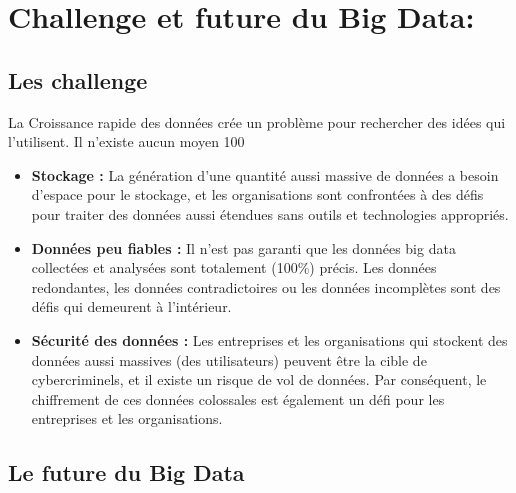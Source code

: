 \section{Challenge et future du Big Data:}

\subsection{Les challenge}
La Croissance rapide des données crée un problème pour rechercher des idées qui l’utilisent. Il n’existe aucun moyen 100%

\begin{itemize}\renewcommand{\labelitemi}{$\bullet$}
\item \textbf{Stockage :} La génération d’une quantité aussi massive de données a besoin d’espace pour le stockage, et les organisations sont confrontées à des défis pour traiter des données aussi étendues sans outils et technologies appropriés.
\item \textbf{Données peu fiables :} Il n’est pas garanti que les données big data collectées et analysées sont totalement (100\%) précis. Les données redondantes, les données contradictoires ou les données incomplètes sont des défis qui demeurent à l’intérieur.
\item \textbf{Sécurité des données :} Les entreprises et les organisations qui stockent des données aussi massives (des utilisateurs) peuvent être la cible de cybercriminels, et il existe un risque de vol de données. Par conséquent, le chiffrement de ces données colossales est également un défi pour les entreprises et les organisations.
\end{itemize}

\subsection{Le future du Big Data}